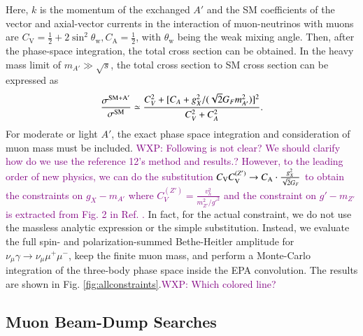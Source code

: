 \documentclass[onecolumn, aps, nofootinbib, prd, preprint, floats, floatfix, amsmath, amssymb, superscriptaddress, preprintnumbers]{revtex4-2}
\newcommand{\WXP}[1]{\textcolor{purple} {WXP: #1}}
\begin{document}
Here, $k$ is the momentum of the exchanged $A'$ and the SM coefficients of the vector and axial-vector currents in the interaction of muon-neutrinos with muons are $C_{\mathrm{V}}=\frac{1}{2}+ 2 \sin ^2 \theta_{\mathrm{w}}, C_{\mathrm{A}}=\frac{1}{2}$, with $\theta_{\mathrm{w}}$ being the weak mixing angle. Then, after the phase-space integration, the total cross section can be obtained. In the heavy mass limit of $m_{A'}\gg\sqrt{s}$, the total cross section to SM cross section can be expressed as
\begin{equation}
    \frac{\sigma^{\rm SM+A'}}{\sigma^{\rm SM}}\simeq\frac{C_V^2+[C_A+g_X^2/(\sqrt{2}G_F m_{A'}^2)]^2}{C_V^2+C_A^2}.
\end{equation}
For moderate or light $A'$, the exact phase space integration and consideration of muon mass must be included. \WXP{Following is not clear? We should clarify how do we use the reference 12's method and results.? However, to the leading order of new physics, we can do the substitution $C_{\rm V} C_{\rm V}^{(Z')}\to C_{\rm A}\cdot \frac{g_X^2}{\sqrt2G_F}$ to obtain the constraints on $g_X-m_{A'}$ where $C_{V}^{(Z')}=\frac{v_h^2}{m_{Z'}^2/g'^2}$ and the constraint on $g'-m_{Z'}$ is extracted from Fig. 2 in Ref. \cite{Altmannshofer:2014pba}.}
In fact, for the actual constraint, we do not use the massless analytic expression or the simple substitution. Instead, we evaluate the full spin- and polarization-summed Bethe-Heitler amplitude for $\nu_\mu\gamma\to\nu_\mu\mu^+\mu^-$, keep the finite muon mass, and perform a Monte-Carlo integration of the three-body phase space inside the EPA convolution. The results are shown in Fig. \ref{fig:allconstraints}.\WXP{Which colored line?}

\subsection{Muon Beam-Dump Searches}
\label{subsec:muon-beam-dump}
\end{document}
